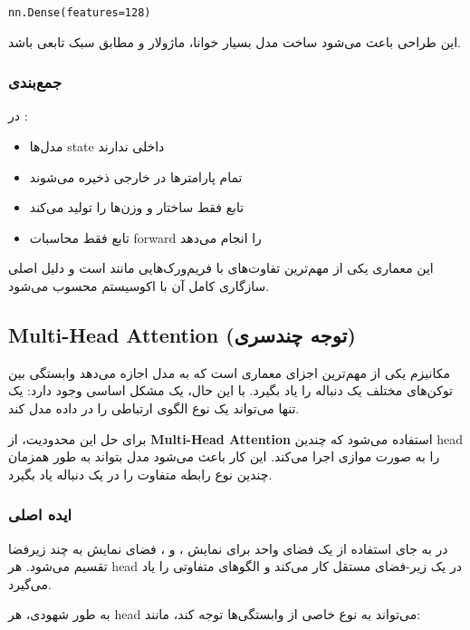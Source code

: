 \documentclass{article}
\begin{document}
\begin{latin}
	\texttt{nn.Dense(features=128)}
\end{latin}

این طراحی باعث می‌شود ساخت مدل بسیار خوانا، ماژولار و مطابق سبک تابعی باشد.

\subsubsection*{جمع‌بندی}

در :

\begin{itemize}
	\item مدل‌ها state داخلی ندارند
	\item تمام پارامترها در  خارجی ذخیره می‌شوند
	\item تابع  فقط ساختار و وزن‌ها را تولید می‌کند
	\item تابع  فقط محاسبات forward را انجام می‌دهد
\end{itemize}

این معماری یکی از مهم‌ترین تفاوت‌های  با فریم‌ورک‌هایی مانند  است و دلیل اصلی سازگاری کامل آن با اکوسیستم  محسوب می‌شود.

\subsection{Multi-Head Attention (توجه چندسری)}

مکانیزم  یکی از مهم‌ترین اجزای معماری  است که به مدل اجازه می‌دهد وابستگی بین توکن‌های مختلف یک دنباله را یاد بگیرد. با این حال، یک مشکل اساسی وجود دارد: یک  تنها می‌تواند یک نوع الگوی ارتباطی را در داده مدل کند.

برای حل این محدودیت، از \textbf{Multi-Head Attention} استفاده می‌شود که چندین head را به صورت موازی اجرا می‌کند. این کار باعث می‌شود مدل بتواند به طور همزمان چندین نوع رابطه متفاوت را در یک دنباله یاد بگیرد.

\subsubsection*{ایده اصلی}

در  به جای استفاده از یک فضای واحد برای نمایش ،  و ، فضای نمایش به چند زیرفضا تقسیم می‌شود. هر head در یک زیر-فضای مستقل کار می‌کند و الگوهای متفاوتی را یاد می‌گیرد.

به طور شهودی، هر head می‌تواند به نوع خاصی از وابستگی‌ها توجه کند، مانند:
\end{document}
